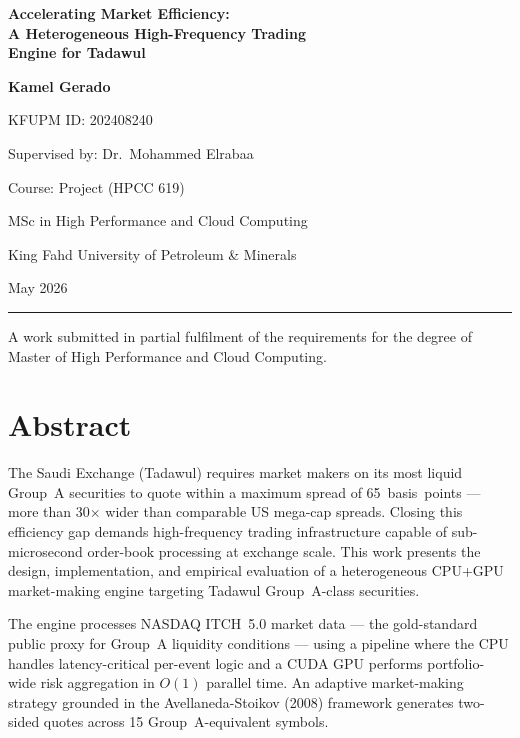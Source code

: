 \documentclass[12pt]{article}
\begin{document}
\begin{titlepage}
  \centering
  \vspace*{2.5cm}
  {\LARGE\bfseries Accelerating Market Efficiency:\\[6pt]
   A Heterogeneous High-Frequency Trading\\[4pt]
   Engine for Tadawul\par}
  \vspace{3cm}
  {\large\bfseries Kamel Gerado\par}
  {\normalsize KFUPM ID: 202408240\par}
  \vspace{0.4cm}
  {\large Supervised by: Dr.\ Mohammed Elrabaa\par}
  \vspace{1.2cm}
  {\large Course: Project (HPCC 619)\par}
  \vspace{0.3cm}
  {\large MSc in High Performance and Cloud Computing\par}
  {\large King Fahd University of Petroleum \& Minerals\par}
  \vspace{1.2cm}
  {\large May 2026\par}
  \vfill
  \hrule
  \vspace{0.4cm}
  {\small A work submitted in partial fulfilment of the requirements for the
   degree of Master of High Performance and Cloud Computing.}
\end{titlepage}

\newpage
\tableofcontents
\newpage

\section*{Abstract}
The Saudi Exchange (Tadawul) requires market makers on its most liquid
Group~A securities to quote within a maximum spread of 65~basis~points
--- more than 30$\times$ wider than comparable US mega-cap spreads. Closing
this efficiency gap demands high-frequency trading infrastructure capable
of sub-microsecond order-book processing at exchange scale. This work
presents the design, implementation, and empirical evaluation of a
heterogeneous CPU+GPU market-making engine targeting Tadawul Group~A-class
securities.

The engine processes NASDAQ ITCH~5.0 market data --- the gold-standard
public proxy for Group~A liquidity conditions --- using a pipeline where
the CPU handles latency-critical per-event logic and a CUDA GPU performs
portfolio-wide risk aggregation in $O(1)$ parallel time. An adaptive
market-making strategy grounded in the Avellaneda-Stoikov (2008) framework
generates two-sided quotes across 15 Group~A-equivalent symbols.
\end{document}
